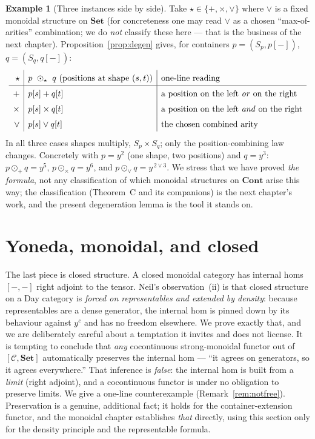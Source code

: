 \documentclass[11pt]{article}
\theoremstyle{plain}
\theoremstyle{definition}
\newtheorem{example}[theorem]{Example}
\newcommand{\Set}{\mathbf{Set}}
\newcommand{\Cont}{\mathbf{Cont}}
\newcommand{\Dayc}{\odot}
\begin{document}
\begin{example}[Three instances side by side]
\label{ex:three}
Take $\star\in\{+,\times,\vee\}$ where $\vee$ is a fixed monoidal structure on
$\Set$ (for concreteness one may read $\vee$ as a chosen ``max-of-arities''
combination; we do \emph{not} classify these here --- that is the business of the
next chapter). Proposition~\ref{prop:degen} gives, for containers
$p=(S_{p},p[-])$, $q=(S_{q},q[-])$:
\[
\renewcommand{\arraystretch}{1.5}
\begin{array}{r|l|l}
  \star & p\ \Dayc_{\star}\ q \text{ (positions at shape }(s,t)) & \text{one-line reading}\\\hline
  + & p[s] + q[t] & \text{a position on the left \emph{or} on the right}\\
  \times & p[s]\times q[t] & \text{a position on the left \emph{and} on the right}\\
  \vee & p[s]\vee q[t] & \text{the chosen combined arity}
\end{array}
\]
In all three cases shapes multiply, $S_{p}\times S_{q}$; only the position-combining
law changes. Concretely with $p=y^{2}$ (one shape, two positions) and $q=y^{3}$:
$p\Dayc_{+}q=y^{5}$, $p\Dayc_{\times}q=y^{6}$, and $p\Dayc_{\vee}q=y^{\,2\vee 3}$.
We stress that we have proved \emph{the formula}, not any classification of which
monoidal structures on $\Cont$ arise this way; the classification (Theorem~C and
its companions) is the next chapter's work, and the present degeneration lemma is
the tool it stands on.
\end{example}

\section{Yoneda, monoidal, and closed}
\label{sec:closed}

The last piece is closed structure. A closed monoidal category has internal homs
$[-,-]$ right adjoint to the tensor. Neil's observation~(ii) is that closed
structure on a Day category is \emph{forced on representables and extended by
density}: because representables are a dense generator, the internal hom is pinned
down by its behaviour against $y^{c}$ and has no freedom elsewhere. We prove
exactly that, and we are deliberately careful about a temptation it invites and
does not license. It is tempting to conclude that \emph{any} cocontinuous
strong-monoidal functor out of $[\mathcal C,\Set]$ automatically preserves the
internal hom --- ``it agrees on generators, so it agrees everywhere.'' That
inference is \emph{false}: the internal hom is built from a \emph{limit}
(right adjoint), and a cocontinuous functor is under no obligation to preserve
limits. We give a one-line counterexample (Remark~\ref{rem:notfree}). Preservation
is a genuine, additional fact; it holds for the container-extension functor, and
the monoidal chapter establishes \emph{that} directly, using this section only for
the density principle and the representable formula.
\end{document}
